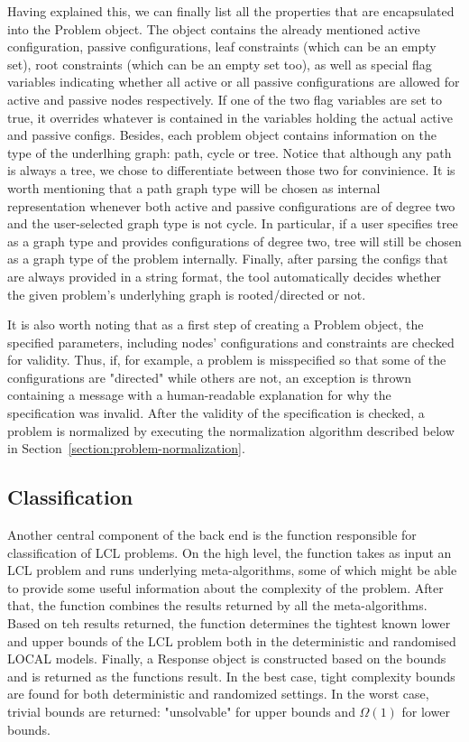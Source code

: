 Having explained this, we can finally list all the
properties that are encapsulated into the
Problem object. The object contains the already
mentioned active configuration, passive configurations,
leaf constraints (which can be an empty set), root constraints
(which can be an empty set too), as well as special flag variables
indicating whether all active or all passive configurations
are allowed for active and passive nodes respectively.
If one of the two flag variables are set to true,
it overrides whatever is contained in the variables
holding the actual active and passive configs.
Besides, each problem object contains information
on the type of the underlhing graph: path, cycle or
tree. Notice that although any path is always a tree,
we chose to differentiate between those two
for convinience. It is worth mentioning that
a path graph type will be chosen as internal
representation whenever both active and
passive configurations are of degree two and
the user-selected graph type is not cycle.
In particular, if a user specifies tree as a graph
type and provides configurations of degree two,
tree will still be chosen as a graph type of the problem
internally. Finally, after parsing the configs
that are always provided in a string format,
the tool automatically decides whether the given problem's
underlyhing graph is rooted/directed or not.

It is also worth noting that as a first step of
creating a Problem object, the specified parameters,
including nodes' configurations and constraints
are checked for validity. Thus, if, for example,
a problem is misspecified so that some of the
configurations are "directed" while others are not,
an exception is thrown containing a message with
a human-readable explanation for why the
specification was invalid. After the validity
of the specification is checked, a problem is
normalized by executing the normalization algorithm
described below in Section~\ref{section:problem-normalization}.

\subsection{Classification}

Another central component of the back end is
the function responsible for classification of LCL problems.
On the high level, the function takes as input an LCL problem and
runs underlying meta-algorithms, some of which might be
able to provide some useful information about the complexity of the
problem. After that, the function combines the results
returned by all the meta-algorithms. Based on teh results returned,
the function determines the tightest known lower and upper bounds of
the LCL problem both in the deterministic and randomised LOCAL
models. Finally, a Response object is constructed based on the bounds
and is returned as the functions result. In the best case, tight
complexity bounds are found for both deterministic and randomized
settings. In the worst case, trivial bounds are returned:
"unsolvable" for upper bounds and $\Omega(1)$ for lower bounds.

